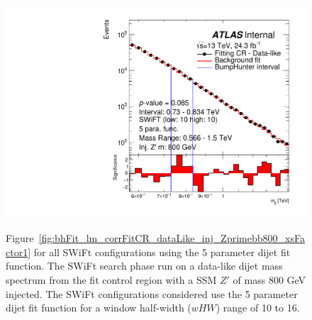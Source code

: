\begin{figure}[!htb]
{}
 {
  \includegraphics[width=0.48\linewidth, angle=0]{figs/Dibjet/LowMass/FitStudy_min566/bhFit_corrFitCR_dataLike_5para_low10_high10_inj_Zprimebb800_xsFactor1.pdf}
}
\vspace{10pt}
\caption[Figure~\ref{fig:bhFit_lm_corrFitCR_dataLike_inj_Zprimebb800_xsFactor1} for all SWiFt configurations using the 5 parameter dijet fit function.]
{\label{fig:app-bhFit_lm_corrFitCR_dataLike_inj_Zprimebb800_xsFactor1_5para}
Figure~\ref{fig:bhFit_lm_corrFitCR_dataLike_inj_Zprimebb800_xsFactor1} for all SWiFt configurations using the 5 parameter dijet fit function.    
  The SWiFt search phase run on a data-like dijet mass spectrum
  from the fit control region with a SSM $Z'$ of mass 800 GeV injected.
  The SWiFt configurations considered use the 5 parameter dijet fit function for a window half-width ($wHW$) range of 10 to 16.
}
\end{figure}

